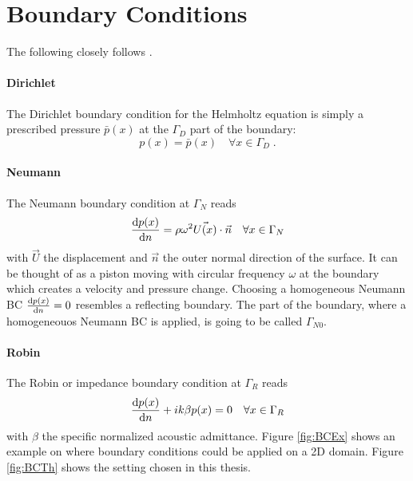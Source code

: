 \documentclass[%
  a4paper,oneside,%
  11pt,%
  smallchapters,
  green,%
  rgb, <cmyk>
  ]{tubsbook}
\begin{document}
\section{Boundary Conditions}
The following closely follows \cite{atalla2015}.
\paragraph{Dirichlet}
The Dirichlet boundary condition for the Helmholtz equation is simply a prescribed pressure $\bar{p}(x)$ at the $\Gamma_D$ part of the boundary:
\begin{equation}
p(x) = \bar{p}(x) \quad \forall x \in \Gamma_D \;.
\end{equation}

	
\paragraph{Neumann}
The Neumann boundary condition at $\Gamma_N$ reads
\begin{equation}
\dv{p(x)}{n} = \rho \omega^2 \vec{U(x)} \cdot \vec{n} \quad \forall x \in \Gamma_N
\end{equation}
with $\vec{U}$ the displacement and $\vec{n}$ the outer normal direction of the surface. It can be thought of as a piston moving with circular frequency $\omega$ at the boundary which creates a velocity and pressure change. Choosing a homogeneous Neumann BC $\dv{p(x)}{n} = 0$ resembles a reflecting boundary. The part of the boundary, where a homogeneouos Neumann BC is applied, is going to be called $\Gamma_{N0}$.

\paragraph{Robin}
The Robin or impedance boundary condition at $\Gamma_R$ reads
\begin{equation}
\dv{p(x)}{n} + ik \beta p(x) = 0 \quad \forall x \in \Gamma_R
\end{equation}
with $\beta$ the specific normalized acoustic admittance.
Figure \ref{fig:BCEx} shows an example on where boundary conditions could be applied on a 2D domain. Figure \ref{fig:BCTh} shows the setting chosen in this thesis.
\end{document}
